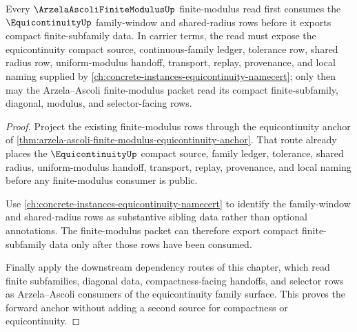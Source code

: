\begin{theorem}
\label{thm:arzela-ascoli-finite-modulus-equicontinuity-forward-anchor}
Every $\ArzelaAscoliFiniteModulusUp$ finite-modulus read first consumes the $\EquicontinuityUp$ family-window and shared-radius rows before it exports compact finite-subfamily data. In carrier terms, the read must expose the equicontinuity compact source, continuous-family ledger, tolerance row, shared radius row, uniform-modulus handoff, transport, replay, provenance, and local naming supplied by \autoref{ch:concrete-instances-equicontinuity-namecert}; only then may the Arzela--Ascoli finite-modulus packet read its compact finite-subfamily, diagonal, modulus, and selector-facing rows.
\end{theorem}
\begin{proof}
Project the existing finite-modulus rows through the equicontinuity anchor of \autoref{thm:arzela-ascoli-finite-modulus-equicontinuity-anchor}. That route already places the $\EquicontinuityUp$ compact source, family ledger, tolerance, shared radius, uniform-modulus handoff, transport, replay, provenance, and local naming before any finite-modulus consumer is public.

Use \autoref{ch:concrete-instances-equicontinuity-namecert} to identify the family-window and shared-radius rows as substantive sibling data rather than optional annotations. The finite-modulus packet can therefore export compact finite-subfamily data only after those rows have been consumed.

Finally apply the downstream dependency routes of this chapter, which read finite subfamilies, diagonal data, compactness-facing handoffs, and selector rows as Arzela--Ascoli consumers of the equicontinuity family surface. This proves the forward anchor without adding a second source for compactness or equicontinuity.
\end{proof}
